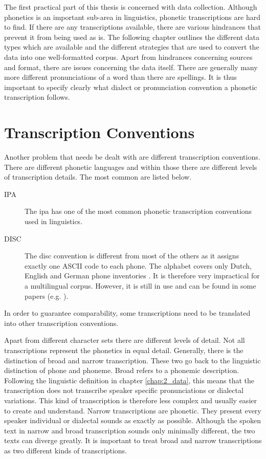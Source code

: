 \label{chap:2_data}
The first practical part of this thesis is concerned with data collection. Although phonetics is an important sub-area in linguistics, phonetic transcriptions are hard to find. If there are any transcriptions available, there are various hindrances that prevent it from being used as is. The following chapter outlines the different data types which are available and the different strategies that are used to convert the data into one well-formatted corpus. Apart from hindrances concerning sources and format, there are issues concerning the data itself. There are generally many more different pronunciations of a word than there are spellings. It is thus important to specify clearly what dialect or pronunciation convention a phonetic transcription follows. 

\section{Transcription Conventions}
\label{transcb-conventions}
Another problem that needs be dealt with are different transcription conventions. There are different phonetic languages and within those there are different levels of transcription details. The most common are listed below.

\begin{description}
\item[IPA] The \ac{ipa} has one of the most common phonetic transcription conventions used in linguistics. 
\item[DISC] The \acs{disc} convention is different from most of the others as it assigns exactly one ASCII code to each phone. The alphabet covers only Dutch, English and German phone inventories \citep{celex2-documentation}. It is therefore very impractical for a multilingual corpus. However, it is still in use and can be found in some papers (e.g. \cite{Rao2015GraphemetophonemeCU}). 
\end{description}

In order to guarantee comparability, some transcriptions need to be translated into other transcription conventions.

Apart from different character sets there are different levels of detail. Not all transcriptions represent the phonetics in equal detail. Generally, there is the distinction of broad and narrow transcription. These two go back to the linguistic distinction of phone and phoneme. Broad refers to a phonemic description. Following the linguistic definition in chapter \ref{chap:2_data}, this means that the transcription does not transcribe speaker specific pronunciations or dialectal variations. This kind of transcription is therefore less complex and usually easier to create and understand. Narrow transcriptions are phonetic. They present every speaker individual or dialectal sounds as exactly as possible. Although the spoken text in narrow and broad transcription sounds only minimally different, the two texts can diverge greatly. It is important to treat broad and narrow transcriptions as two different kinds of transcriptions. 



